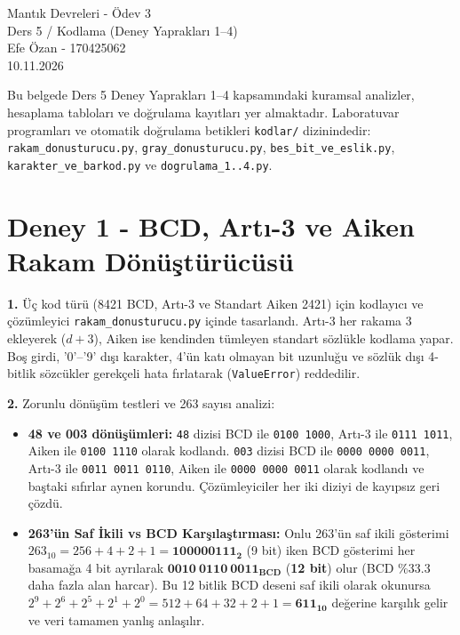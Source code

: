 \documentclass[10pt,a4paper]{article}
\begin{document}
\begin{center}
    {\LARGE Mantık Devreleri - Ödev 3}\\[4pt]
    {\large Ders 5 / Kodlama (Deney Yaprakları 1--4)}\\[6pt]
    {\normalsize Efe Özan - 170425062}\\[3pt]
    {\normalsize 10.11.2026}
\end{center}
\vspace{1pt}

Bu belgede Ders 5 Deney Yaprakları 1--4 kapsamındaki kuramsal analizler, hesaplama tabloları ve doğrulama kayıtları yer almaktadır. Laboratuvar programları ve otomatik doğrulama betikleri \texttt{kodlar/} dizinindedir:
\texttt{rakam\_donusturucu.py}, \texttt{gray\_donusturucu.py}, \texttt{bes\_bit\_ve\_eslik.py}, \texttt{karakter\_ve\_barkod.py} ve \texttt{dogrulama\_1..4.py}.

\section*{Deney 1 - BCD, Artı-3 ve Aiken Rakam Dönüştürücüsü}

\textbf{1.} Üç kod türü (8421 BCD, Artı-3 ve Standart Aiken 2421) için kodlayıcı ve çözümleyici \texttt{rakam\_donusturucu.py} içinde tasarlandı. Artı-3 her rakama 3 ekleyerek ($d+3$), Aiken ise kendinden tümleyen standart sözlükle kodlama yapar. Boş girdi, '0'--'9' dışı karakter, 4'ün katı olmayan bit uzunluğu ve sözlük dışı 4-bitlik sözcükler gerekçeli hata fırlatarak (\texttt{ValueError}) reddedilir.

\textbf{2.} Zorunlu dönüşüm testleri ve 263 sayısı analizi:
\begin{itemize}
    \item \textbf{48 ve 003 dönüşümleri:} \texttt{48} dizisi BCD ile \texttt{0100 1000}, Artı-3 ile \texttt{0111 1011}, Aiken ile \texttt{0100 1110} olarak kodlandı. \texttt{003} dizisi BCD ile \texttt{0000 0000 0011}, Artı-3 ile \texttt{0011 0011 0110}, Aiken ile \texttt{0000 0000 0011} olarak kodlandı ve baştaki sıfırlar aynen korundu. Çözümleyiciler her iki diziyi de kayıpsız geri çözdü.
    \item \textbf{263'ün Saf İkili vs BCD Karşılaştırması:} Onlu 263'ün saf ikili gösterimi $263_{10} = 256 + 4 + 2 + 1 = \mathbf{100000111_2}$ (9 bit) iken BCD gösterimi her basamağa 4 bit ayrılarak $\mathbf{0010\ 0110\ 0011_{BCD}}$ (\textbf{12 bit}) olur (BCD \%33.3 daha fazla alan harcar). Bu 12 bitlik BCD deseni saf ikili olarak okunursa $2^9 + 2^6 + 2^5 + 2^1 + 2^0 = 512 + 64 + 32 + 2 + 1 = \mathbf{611_{10}}$ değerine karşılık gelir ve veri tamamen yanlış anlaşılır.
\end{itemize}
\end{document}
